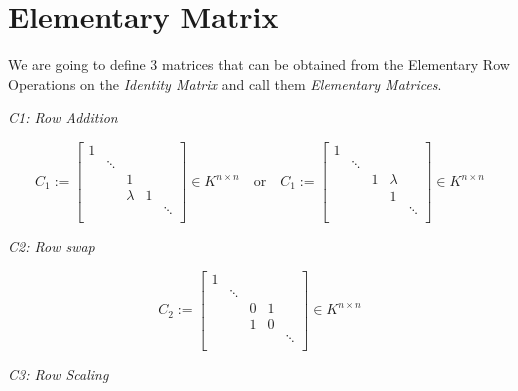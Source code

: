 \newpage
\section{Elementary Matrix}

We are going to define 3 matrices that can be obtained from the Elementary Row
Operations on the \emph{Identity Matrix} and call them \emph{Elementary Matrices}.

\emph{C1: Row Addition}

\[
       C_1 := 
       \begin{bmatrix}
       1      &        &        &        &        \\
              & \ddots &        &        &        \\
              &        & 1      &        &        \\
              &        & \lambda & 1     &        \\
              &        &        &        & \ddots \\
       \end{bmatrix}
       \in K^{n \times n}
       \quad \text{or} \quad
       C_1 := 
       \begin{bmatrix}
       1      &        &        &        &        \\
              & \ddots &        &        &        \\
              &        & 1      & \lambda &        \\
              &        &        & 1      &        \\
              &        &        &        & \ddots \\
       \end{bmatrix}
       \in K^{n \times n}
\]

\emph{C2: Row swap}

\[
       C_2 := 
       \begin{bmatrix}
       1      &        &        &        &        \\
              & \ddots &        &        &        \\
              &        & 0      & 1      &        \\
              &        & 1      & 0      &        \\
              &        &        &        & \ddots \\
       \end{bmatrix}
       \in K^{n \times n}
\]

\emph{C3: Row Scaling}

